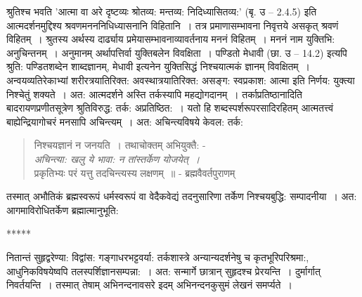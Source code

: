 {श्रुतिश्च भवति 'आत्मा वा अरे दृष्टव्यः श्रोतव्य: मन्तव्य: निदिध्यासितव्य:' (बृ. उ – 2.4.5) इति आत्मदर्शनमुद्दिश्य श्रवणमनननिधिध्यासनानि विहितानि~। तत्र प्रमाणासम्भावना निवृत्तये असकृत् श्रवणं विहितम्~। श्रुतस्य अर्थस्य दार्ढ्याय प्रमेयासम्भावनाव्यावर्तनाय मननं विहितम्~। मननं नाम युक्तिभि: अनुचिन्तनम्~। अनुमानम् अर्थापत्तिर्वा युक्तिबलेन विवक्षिता~। पण्डितो मेधावी (छा. उ – 14.2) इत्यपि श्रुति: पण्डितशब्देन शाब्दज्ञानम्, मेधावी इत्यनेन युक्तिसिद्धं निश्चयात्मकं ज्ञानम् विवक्षितम्~। अन्वयव्यतिरेकाभ्यां शरीरत्रयातिरिक्त: अवस्थात्रयातिरिक्त: असङ्ग: स्वप्रकाश: आत्मा इति निर्णय: युक्त्या निश्चेतुं शक्यते~। अत: आत्मदर्शने अस्ति तर्कस्यापि महद्योगदानम्~। तर्काप्रतिष्ठानादिति बादरायणप्रणीतसूत्रेण श्रुतिविरुद्ध: तर्क: अप्रतिष्ठित:~। यतो हि शब्दस्पर्शरूपरसादिरहितम् आत्मतत्त्वं बाह्येन्द्रियागोचरं मनसापि अचिन्त्यम्~। अत: अचिन्त्यविषये केवल: तर्क:
\begin{verse}
निश्चयज्ञानं न जनयति~। तथाचोक्तम् अभियुक्तै: -\\
\textit{अचिन्त्या: खलु ये भावा: न तांस्तर्केण योजयेत्~। }\\
प्रकृतिभ्यः परं यत्तु तदचिन्त्यस्य लक्षणम्~॥ - ब्रह्मवैवर्तपुराणम्
\end{verse}
तस्मात् अभौतिकं ब्रह्मस्वरूपं धर्मस्वरूपं वा वेदैकवेद्यं तदनुसारिणा तर्केण निश्चयबुद्धि: सम्पादनीया~। अत: आगमाविरोधितर्केण ब्रह्मात्मानुभूति: 

\centerline{*****}

नितान्तं सुहृद्वरेण्या: विद्वांस: गङ्गाधरभट्टवर्या: तर्कशास्त्रे अन्यान्यदर्शनेषु च कृतभूरिपरिश्रमा:, आधुनिकविषयेष्वपि तलस्पर्शिज्ञानसम्पन्ना:~। अत: सन्मार्गे छात्रान् सुहृदश्च प्रेरयन्ति~। दुर्मार्गात् निवर्तयन्ति~। तस्मात् तेषाम् अभिनन्दनावसरे इदम् अभिनन्दनकुसुमं लेखनं समर्प्यते~। 

\articleend
}
